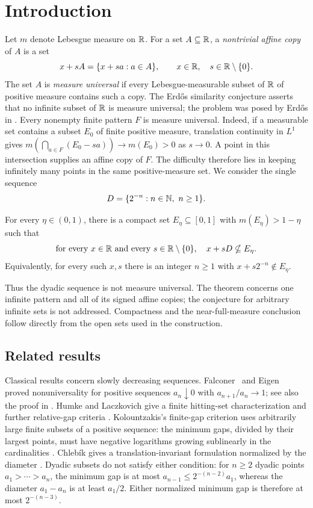\section{Introduction}\label{sec:introduction}

Let $m$ denote Lebesgue measure on $\mathbb R$. For a set $A\subseteq\mathbb R$, a
\emph{nontrivial affine copy} of $A$ is a set
\[
 x+sA=\{x+sa:a\in A\},\qquad x\in\mathbb R,\quad s\in\mathbb R\setminus\{0\}.
\]
The set $A$ is \emph{measure universal} if every Lebesgue-measurable subset
of $\mathbb R$ of positive measure contains such a copy. The Erd\H{o}s similarity
conjecture asserts that no infinite subset of $\mathbb R$ is measure universal;
the problem was posed by Erd\H{o}s in
\cite[Problem~4.33.7*]{Erdos1974Problems}.
Every nonempty finite pattern $F$ is measure universal. Indeed, if a measurable
set contains a subset $E_0$ of finite positive measure, translation
continuity in $L^1$ gives
$m(\bigcap_{a\in F}(E_0-sa))\to m(E_0)>0$ as $s\to0$.
A point in this intersection supplies an affine copy of $F$.
The difficulty therefore lies in keeping infinitely many points in the
same positive-measure set. We consider the single sequence
\[
 D=\{2^{-n}:n\in\mathbb N,\ n\ge1\}.
\]

\begin{theorem}\label{thm:main}
For every $\eta\in(0,1)$, there is a compact set $E_\eta\subseteq[0,1]$
with $m(E_\eta)>1-\eta$ such that
\[
 \text{for every }x\in\mathbb R\text{ and every }s\in\mathbb R\setminus\{0\},
 \quad x+sD\nsubseteq E_\eta.
\]
Equivalently, for every such $x,s$ there is an integer $n\ge1$ with
$x+s2^{-n}\notin E_\eta$.
\end{theorem}

Thus the dyadic sequence is not measure universal. The theorem concerns
one infinite pattern and all of its signed affine copies; the conjecture
for arbitrary infinite sets is not addressed. Compactness and the
near-full-measure conclusion follow directly from the open sets used in
the construction.

\subsection{Related results}

Classical results concern slowly decreasing sequences.
Falconer~\cite{Falconer1984} and Eigen~\cite{Eigen1985} proved
nonuniversality for positive sequences $a_n\downarrow0$ with
$a_{n+1}/a_n\to1$; see also the proof in
\cite[Corollary~1]{HumkeLaczkovich1998}.
Humke and Laczkovich give a finite hitting-set characterization and
further relative-gap criteria \cite[Theorems~1--2]{HumkeLaczkovich1998}.
Kolountzakis's finite-gap criterion uses arbitrarily large finite subsets
of a positive sequence: the minimum gaps, divided by their largest points,
must have negative logarithms growing sublinearly in the cardinalities
\cite[Theorem~3]{Kolountzakis1997}. Chleb\'ik gives a translation-invariant
formulation normalized by the diameter
\cite[Theorem~15]{Chlebik2015}. Dyadic subsets do not satisfy either
condition: for $n\ge2$ dyadic points $a_1>\cdots>a_n$, the minimum gap
is at most $a_{n-1}\le2^{-(n-2)}a_1$, whereas the diameter
$a_1-a_n$ is at least $a_1/2$. Either normalized minimum gap is therefore
at most $2^{-(n-3)}$.

